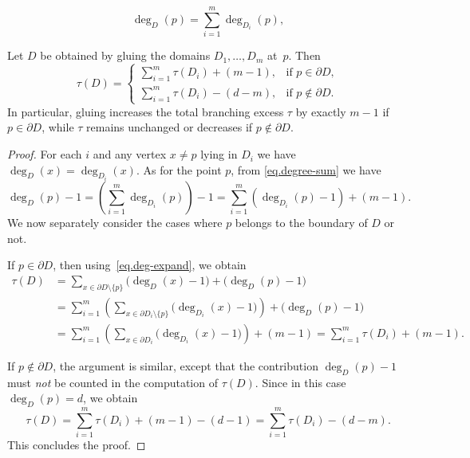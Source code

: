\documentclass[10pt,a4paper]{amsart}
\begin{document}
\begin{equation}\label{eq.degree-sum}
   \deg_D(p)=\sum_{i=1}^m \deg_{D_i}(p),
\end{equation}

\begin{proposition}\label{prop:tau-gluing}
Let $D$ be obtained by gluing the domains $D_1,\dots,D_m$ at~$p$. Then
\[
   \tau(D) = \begin{cases}
       \displaystyle \sum_{i=1}^m \tau(D_i) + (m-1),          &\text{if } p\in\partial D, \\[0.3cm]
       \displaystyle \sum_{i=1}^m \tau(D_i) - (d-m),           &\text{if } p\notin\partial D .
     \end{cases}
\]
In particular, gluing increases the total branching excess  $\tau$ by exactly  $m-1$ if  $p\in \partial D$, while $\tau$ remains unchanged or decreases if  $p \not\in \partial D$.
\end{proposition}

\begin{proof}
For each $i$ and any vertex  $x\ne p$ lying in $D_i$ we have $\deg_D(x)=\deg_{D_i}(x)$.  As for the point $p$,  from \eqref{eq.degree-sum} we have
\begin{equation}\label{eq.deg-expand}
   \deg_D(p)-1  = \left( \sum_{i=1}^m \deg_{D_i}(p)\right) - 1    = \sum_{i=1}^m (\deg_{D_i}(p)-1) + (m-1).
\end{equation}
We now separately consider the cases where $p$ belongs to the boundary of $D$ or not.

\smallskip 

If  $p\in\partial D$, then  using~\eqref{eq.deg-expand}, we obtain
\begin{align*}
\tau(D)  &= \sum_{x\in \partial D\setminus \{p\}} \bigl(\deg_D(x)-1\bigr)    + \bigl(\deg_D(p)-1\bigr) 
 \\[0.3em] &=  \sum_{i=1}^m    \left(\sum_{x\in \partial D_i\setminus \{p\}}    \bigl(\deg_{D_i}(x)-1\bigr)\right)    + \bigl(\deg_D(p)-1\bigr) \\[0.3em]
&= \sum_{i=1}^m    \left(\sum_{x\in \partial D_i}    \bigl(\deg_{D_i}(x)-1\bigr)\right)    + (m-1)  = \sum_{i=1}^m \tau(D_i) + (m-1).
\end{align*}


\smallskip 

If $p\notin\partial D$, the argument is similar, except that the contribution $\deg_D(p)-1$ must \textit{not} be counted in the computation of $\tau(D)$. Since in this case $\deg_D(p)=d$, we obtain
\[
 \tau(D) = \sum_{i=1}^m \tau(D_i) + (m-1) - (d-1)  = \sum_{i=1}^m \tau(D_i) - (d-m).
\]
This concludes the proof.
\end{proof}
\end{document}
